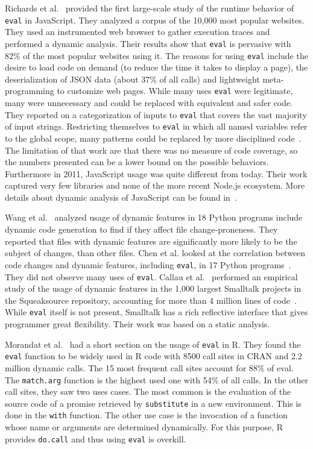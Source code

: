\documentclass[a4paper,USenglish,cleveref, autoref, thm-restate]{lipics-v2019}
\newcommand{\eval}{\texttt{eval}\xspace}
\renewcommand{\c}[1]{\lstinline{#1}\xspace}
\begin{document}
Richards et al.~\cite{ecoop11} provided the first large-scale study of the
runtime behavior of \eval in JavaScript. They analyzed a corpus of the
10,000 most popular websites. They used an instrumented web browser to
gather execution traces and performed a dynamic analysis.  Their results show
that \eval is pervasive with 82\% of the most popular websites using it. The
reasons for using \eval include the desire to load code on demand (to reduce
the time it takes to display a page), the deserialization of JSON data
(about 37\% of all calls) and lightweight meta-programming to customize web
pages.  While many uses \eval were legitimate, many were unnecessary and
could be replaced with equivalent and safer code.  They reported on a
categorization of inputs to \eval that covers the vast majority of input
strings.  Restricting themselves to \eval in which all named variables refer
to the global scope, many patterns could be replaced by more disciplined
code~\cite{oopsla12b}.  The limitation of that work are that there was no
measure of code coverage, so the numbers presented can be a lower bound on
the possible behaviors.  Furthermore in 2011, JavaScript usage was quite
different from today. Their work captured very few libraries and none of the
more recent Node.js ecosystem.  More details about dynamic analysis of
JavaScript can be found in~\cite{liang}.

Wang et al.~\cite{wang} analyzed usage of dynamic features in 18 Python
programs include dynamic code generation to find if they affect file
change-proneness.  They reported that files with dynamic features are
significantly more likely to be the subject of changes, than other files.
Chen et al. looked at the correlation between code changes and dynamic
features, including \eval, in 17 Python programs~\cite{chen}. They did not
observe many uses of \eval.  Callau et al.~\cite{oscar} performed an empirical study of
the usage of dynamic features in the 1,000 largest Smalltalk projects in the
Squeaksource repository, accounting for more than 4 million lines of
code~\cite{oscar}. While \eval itself is not present, Smalltalk has a rich
reflective interface that gives programmer great flexibility. Their work was
based on a static analysis.

Morandat et al.~\cite{ecoop12} had a short section on the usage of \eval in
R. They found the \eval function to be widely used in R code with 8500 call
sites in CRAN and 2.2 million dynamic calls. The 15 most frequent call sites
account for 88\% of eval. The \c{match.arg} function is the highest used one
with 54\% of all calls. In the other call sites, they saw two uses
cases. The most common is the evaluation of the source code of a promise
retrieved by \c{substitute} in a new environment. This is done in the
\c{with} function. The other use case is the invocation of a function whose
name or arguments are determined dynamically. For this purpose, R provides
\c{do.call} and thus using \eval is overkill.
\end{document}
